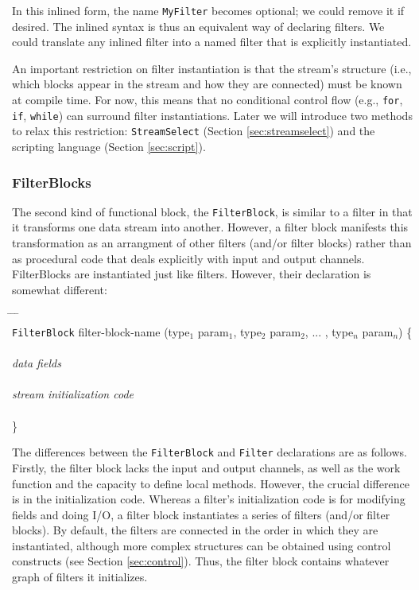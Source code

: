 \documentclass[draft]{article}
\begin{document}
In this inlined form, the name {\tt MyFilter} becomes optional; we
could remove it if desired.  The inlined syntax is thus an equivalent
way of declaring filters.  We could translate any inlined filter into
a named filter that is explicitly instantiated.

An important restriction on filter instantiation is that the stream's
structure (i.e., which blocks appear in the stream and how they are
connected) must be known at compile time.  For now, this means that no
conditional control flow (e.g., {\tt for}, {\tt if}, {\tt while}) can
surround filter instantiations.  Later we will introduce two methods
to relax this restriction: {\tt StreamSelect} (Section
\ref{sec:streamselect}) and the scripting language (Section
\ref{sec:script}).

\subsubsection{FilterBlocks}

The second kind of functional block, the {\tt FilterBlock}, is similar
to a filter in that it transforms one data stream into another.
However, a filter block manifests this transformation as an arrangment
of other filters (and/or filter blocks) rather than as procedural code
that deals explicitly with input and output channels.  FilterBlocks
are instantiated just like filters.  However, their declaration is
somewhat different:

\begin{tabbing}
\hspace{0.2in} \= \hspace{0.2in} \= \hspace{0.2in} \= \hspace{0.2in} \= \\

{\tt FilterBlock} filter-block-name (type$_1$ param$_1$, type$_2$ param$_2$,
... , type$_n$ param$_n$) \{ \\ \\

\> {\it data fields} \\ \\

\> {\it stream initialization code} \\ \\

\}
\end{tabbing}

The differences between the {\tt FilterBlock} and {\tt Filter}
declarations are as follows.  Firstly, the filter block lacks the
input and output channels, as well as the work function and the
capacity to define local methods.  However, the crucial difference is
in the initialization code.  Whereas a filter's initialization code is
for modifying fields and doing I/O, a filter block instantiates a
series of filters (and/or filter blocks).  By default, the filters are
connected in the order in which they are instantiated, although more
complex structures can be obtained using control constructs (see
Section {\ref{sec:control}}).  Thus, the filter block contains whatever
graph of filters it initializes.  
\end{document}
